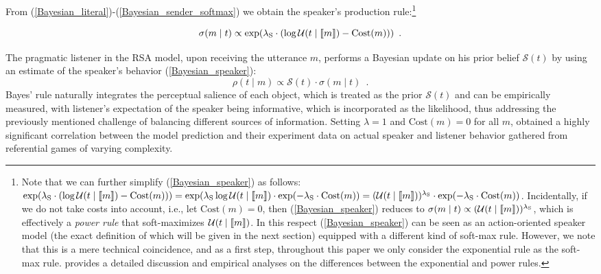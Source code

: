 From (\ref{Bayesian_literal})-(\ref{Bayesian_sender_softmax}) we
obtain the speaker's production rule:\footnote{Note that we can further
  simplify (\ref{Bayesian_speaker}) as follows:
  $\exp(\lambda_\mathrm{S} \cdot (\log \mathcal{U}(t\mid
  \llbracket m \rrbracket)-\mbox{Cost}(m))) =\exp(\lambda_\mathrm{S} \log
  \mathcal{U}(t\mid \llbracket m \rrbracket) \cdot \exp(-\lambda_\mathrm{S}\cdot
  \mbox{Cost}(m)) =(\mathcal{U}(t\mid
  \llbracket m \rrbracket))^{\lambda_\mathrm{S}}\cdot \exp(-\lambda_\mathrm{S}\cdot
  \mbox{Cost}(m))$. Incidentally, if we do not take costs into
  account, i.e., let $\mbox{Cost}(m) = 0$, then
  (\ref{Bayesian_speaker}) reduces to $\sigma(m \mid t) \propto
  (\mathcal{U}(t\mid \llbracket m \rrbracket))^{\lambda_\mathrm{S}}$, which is
  effectively a \emph{power rule} that soft-maximizes
  $\mathcal{U}(t\mid \llbracket m \rrbracket)$. In this respect
  (\ref{Bayesian_speaker}) can be seen as an action-oriented speaker
  model (the exact definition of which will be given in the next
  section) equipped with a different kind of soft-max rule. However,
  we note that this is a mere technical coincidence, and as a first
  step, throughout this paper we only consider the exponential rule as
  the soft-max rule. \cite{Worthy2008ratio} provides a detailed
  discussion and empirical analyses on the differences between the
  exponential and power rules.}

\begin{equation} \label{Bayesian_speaker}
\sigma(m \mid t) \propto \exp(\lambda_\mathrm{S} \cdot (\log \mathcal{U}(t\mid \llbracket m \rrbracket)-\mbox{Cost}(m))) \enspace .
\end{equation}

The pragmatic listener in the RSA model, upon receiving the utterance
$m$, performs a Bayesian update on his prior belief $\mathcal{S}(t)$
by using an estimate of the speaker's behavior
(\ref{Bayesian_speaker}):
\begin{equation} \label{Bayesian_rec_update}
\rho(t \mid m) \propto \mathcal{S}(t)\cdot \sigma(m \mid t) \enspace .  
\end{equation}
Bayes' rule naturally integrates the perceptual salience of each
object, which is treated as the prior $\mathcal{S}(t)$ and can be
empirically measured, with listener's expectation of the speaker being
informative, which is incorporated as the likelihood, thus addressing
the previously mentioned challenge of balancing different sources of
information. Setting $\lambda=1$ and $\mbox{Cost}(m)=0$ for all $m$,
\cite{Frank} obtained a highly significant correlation between the
model prediction and their experiment data on actual speaker and
listener behavior gathered from referential games of varying
complexity.


